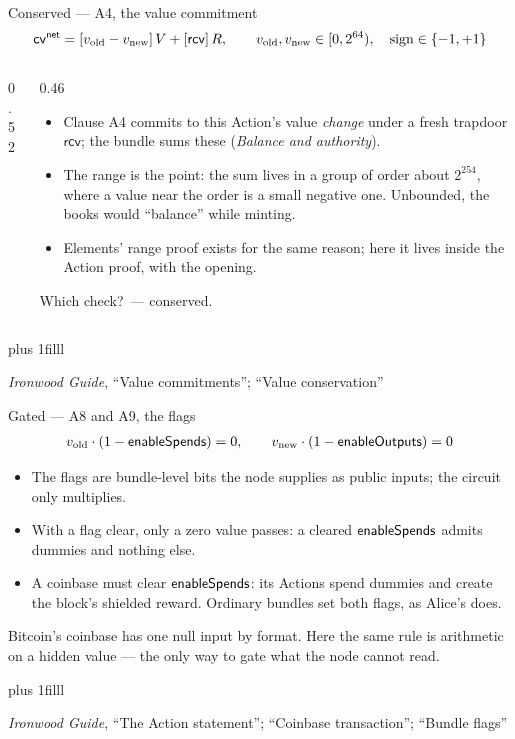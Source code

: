 \documentclass[aspectratio=169,11pt]{beamer}
\newcommand{\rcv}{\ensuremath{\mathsf{rcv}}}
\newcommand{\src}[1]{\par\vskip0pt plus 1filll
  {\fontsize{6}{7.2}\selectfont\color{arbdim}\raggedright #1\par}}
\begin{document}
\begin{frame}{Conserved --- A4, the value commitment}
\vspace{-6pt}
\[
\Ecv = [\Eold{v} - \Enew{v}]\,V + [\rcv]\,R, \qquad
\Eold{v}, \Enew{v} \in [0, 2^{64}),\quad \text{sign} \in \{-1, +1\}
\]
\vspace{-10pt}
\begin{columns}[T]
\begin{column}{0.52\textwidth}
\centering\ActionBox[cv]
\end{column}
\begin{column}{0.46\textwidth}
\begin{itemize}\small
  \item Clause A4 commits to this Action's value \emph{change} under a
    fresh trapdoor $\rcv$; the bundle sums these (\emph{Balance and
    authority}).
  \item The range is the point: the sum lives in a group of order about
    $2^{254}$, where a value near the order is a small negative one.
    Unbounded, the books would ``balance'' while minting.
  \item Elements' range proof exists for the same reason; here it lives
    inside the Action proof, with the opening.
\end{itemize}
\vspace{1pt}
\alert{Which check?}\pause\ --- conserved.
\end{column}
\end{columns}
\src{\emph{Ironwood Guide}, ``Value commitments''; ``Value conservation''}
\end{frame}

\begin{frame}{Gated --- A8 and A9, the flags}
\begin{gather*}
v_{\mathrm{old}} \cdot (1 - \mathsf{enableSpends}) = 0, \qquad
v_{\mathrm{new}} \cdot (1 - \mathsf{enableOutputs}) = 0
\end{gather*}
\begin{itemize}
  \item The flags are bundle-level bits the node supplies as public
    inputs; the circuit only multiplies.
  \item With a flag clear, only a zero value passes: a cleared
    $\mathsf{enableSpends}$ admits dummies and nothing else.
  \item A coinbase must clear $\mathsf{enableSpends}$: its Actions spend
    dummies and create the block's shielded reward. Ordinary bundles
    set both flags, as Alice's does.
\end{itemize}
\medskip
\small Bitcoin's coinbase has one null input by format. Here the same
rule is arithmetic on a hidden value --- the only way to gate what the
node cannot read.
\src{\emph{Ironwood Guide}, ``The Action statement''; ``Coinbase transaction'';
  ``Bundle flags''}
\end{frame}
\end{document}
